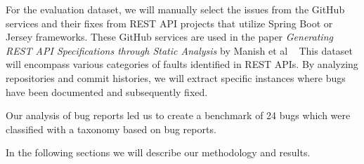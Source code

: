 \documentclass[conference]{IEEEtran}
\begin{document}
For the evaluation dataset, we will manually select the issues from the GitHub services and their fixes from REST API projects that utilize Spring Boot or Jersey frameworks. These GitHub services are used in the paper  \textit{Generating REST API Specifications through Static Analysis} by Manish et al ~\cite{ManishRestServices}
This dataset will encompass various categories of faults identified in REST APIs. By analyzing repositories and commit histories, we will extract specific instances where bugs have been documented and subsequently fixed. 


Our analysis of bug reports led us to create a benchmark of 24 bugs which were classified with a taxonomy based on bug reports.

In the following sections we will describe our methodology and results.




\end{document}
